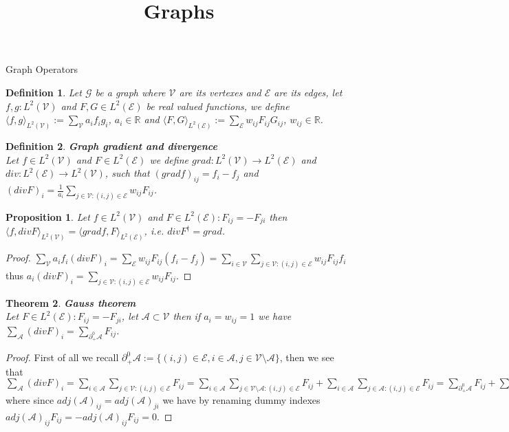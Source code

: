 \documentclass{article}
\title{Graphs}
\author{}
\date{}
\newtheorem{thm}{Theorem}[section]
\newtheorem{prop}[thm]{Proposition}
\newtheorem{defn}{Definition}[section]
\newcommand{\bb}[1]{\textbf{#1}}
\newcommand{\R}{\mathbb{R}}
\newcommand{\scal}[2]{\langle #1 , #2 \rangle}
\newcommand{\mc}{\mathcal}
\begin{document}
    \maketitle
    \begin{section}{Graph Operators}
        
	\begin{defn}
            Let $\mc{G}$ be a graph where $\mc{V}$ are its vertexes and $\mc{E}$ are its edges, let $f,g : L^2(\mc{V})$ 
	    and $F,G \in L^2(\mc{E})$ be real valued functions, we define
	    $\scal{f}{g}_{L^2(\mc{V})} := \sum_\mc{V} a_i f_i g_i$, $a_i \in \R$ and
	    $\scal{F}{G}_{L^2(\mc{E})} := \sum_\mc{E} w_{ij} F_{ij} G_{ij}$, $w_{ij} \in \R$.
	\end{defn}
        
	\begin{defn}
	    \bb{Graph gradient and divergence}\\ 
	    Let $f \in L^2(\mc{V})$ and $F \in L^2(\mc{E})$ we define $grad : L^2(\mc{V}) \to L^2(\mc{E})$ and $div : L^2(\mc{E}) \to L^2(\mc{V})$,
	    such that $(gradf)_{ij}=f_i-f_j$ and $(divF)_i=\frac{1}{a_i}\sum_{j \in \mc{V} : (i,j) \in \mc{E}} w_{ij} F_{ij}$.
	\end{defn}

	\begin{prop}
	    Let $f \in L^2(\mc{V})$ and $F \in L^2(\mc{E}) : F_{ij}=-F_{ji}$ then $\scal{f}{divF}_{L^2(\mc{V})} = \scal{gradf}{F}_{L^2(\mc{E})}$,
	    i.e. $divF^\dag = grad$.
	\end{prop}
	\begin{proof}
	    $\sum_\mc{V} a_i f_i (divF)_i = \sum_{\mc{E}} w_{ij} F_{ij} (f_i-f_j) = \sum_{i \in \mc{V}}\sum_{j \in \mc{V} : (i,j) \in \mc{E}} w_{ij} F_{ij} f_i$
	    thus $a_i (divF)_i = \sum_{j \in \mc{V} : (i,j) \in \mc{E}} w_{ij} F_{ij}$.
	\end{proof}

	\begin{thm}
	    \bb{Gauss theorem}\\
	    Let $F \in L^2(\mc{E}) : F_{ij}=-F_{ji}$, let $\mc{A} \subset \mc{V}$ then if $a_i = w_{ij} = 1$ we have
	    $\sum_{\mc{A}} (divF)_i = \sum_{\partial_+^0 \mc{A}} F_{ij}$.
	\end{thm}
	\begin{proof}
	    First of all we recall $\partial_+^0 \mc{A} := \{ (i,j) \in \mc{E}, i \in \mc{A}, j \in \mc{V \setminus A} \}$, then we see that
            $\sum_{\mc{A}} (divF)_i = \sum_{i \in \mc{A}}\sum_{j \in \mc{V} : (i,j) \in \mc{E}} F_{ij} =
	    \sum_{i \in \mc{A}}\sum_{j \in \mc{V \setminus A} : (i,j) \in \mc{E}} F_{ij} +
            \sum_{i \in \mc{A}}\sum_{j \in \mc{A} : (i,j) \in \mc{E}} F_{ij} = \sum_{\partial_+^0 \mc{A}} F_{ij} + \sum_{(i,j) \in \mc{A}^2} adj(\mc{A})_{ij} F_{ij}$
	    where since $adj(\mc{A})_{ij} = adj(\mc{A})_{ji}$ we have by renaming dummy indexes $adj(\mc{A})_{ij} F_{ij} = -adj(\mc{A})_{ij} F_{ij} = 0$.
        \end{proof}
    

\end{section}
\end{document}
